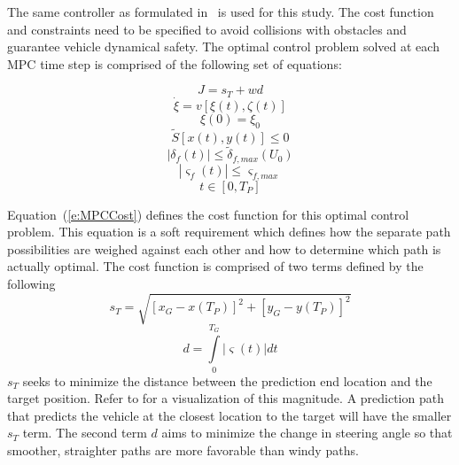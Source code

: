 \documentclass[12pt,twocolumn]{article}
\begin{document}
The same controller as formulated in~\cite{foo} is used for this study. The cost function and constraints need to be specified to avoid collisions with obstacles and guarantee vehicle dynamical safety. The optimal control problem solved at each MPC time step is comprised of the following set of equations:

\begin{equation}\label{e:MPCCost}
J = s_T + wd 
\end{equation}
\begin{equation}\label{e:State_ODE}
\dot{\xi} = v\left[\xi\left(t\right),\zeta\left(t\right)\right] 
\end{equation}
\begin{equation}\label{e:InitialStates}
\xi\left(0\right) = \xi_0 
\end{equation}
\begin{equation}\label{e:SafeArea}
\tilde{S}\left[x\left(t\right),y\left(t\right)\right] \leq0  
\end{equation}
\begin{equation}\label{e:SteerLimit}
\left|\delta_f\left(t\right)\right| \leq\tilde{\delta}_{f,max}\left(U_0\right) 
\end{equation}
\begin{equation}\label{e:SteerRateLimit}
\left|\varsigma_f\left(t\right)\right| \leq\varsigma_{f,max} 
\end{equation}
\begin{equation}\label{e:TimeDomain}
t \in \left[0,T_P\right]
\end{equation}

Equation~(\ref{e:MPCCost}) defines the cost function for this optimal control problem. This equation is a soft requirement which defines how the separate path possibilities are weighed against each other and how to determine which path is actually optimal. The cost function is comprised of two terms defined by the following
%
\begin{equation}\label{e:DistanceCost}
s_T = \sqrt{\left[ x_G - x\left(T_P\right)\right]^2 + \left[y_G - y\left(T_P\right)\right]^2 }
\end{equation}
\begin{equation}\label{e:TurningCost}
d = \int \limits_0^{T_G} \left|\varsigma\left(t\right)\right| dt 
\end{equation}
%
$s_{T}$ seeks to minimize the distance between the prediction end location and the target position. Refer to  for a visualization of this magnitude. A prediction path that predicts the vehicle at the closest location to the target will have the smaller $s_{T}$ term. The second term $d$ aims to minimize the change in steering angle so that smoother, straighter paths are more favorable than windy paths.
\end{document}

